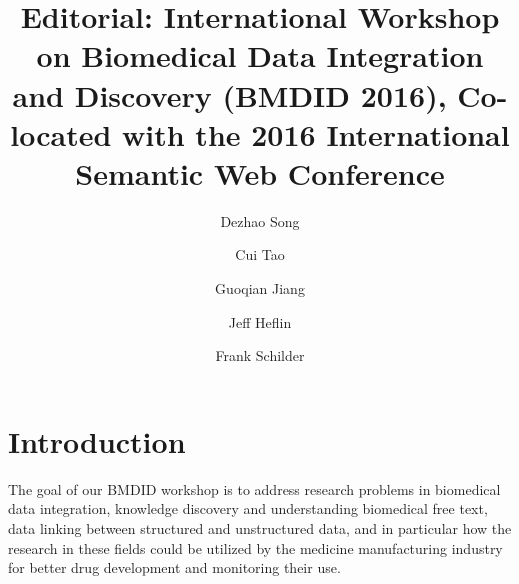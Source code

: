 \documentclass[runningheads,a4paper]{llncs}
\begin{document}
\mainmatter  %

\title{Editorial: International Workshop on Biomedical Data Integration and Discovery (BMDID 2016), Co-located with the 2016 International Semantic Web Conference
}


%
%
\author[1]{Dezhao Song}
\author[2]{Cui Tao}
\author[3]{Guoqian Jiang}
\author[4]{Jeff Heflin}
\author[1]{Frank Schilder}
\renewcommand\Authands{ and }

%

\institute{}

%
%

\maketitle

\section{Introduction}

The goal of our BMDID workshop is to address research problems in biomedical data integration, knowledge discovery and understanding biomedical free text, data linking between structured and unstructured data, and in particular how the research in these fields could be utilized by the medicine manufacturing industry for better drug development and monitoring their use. 
\end{document}
